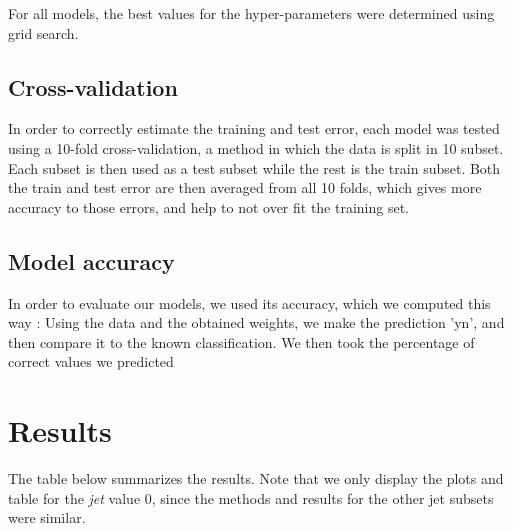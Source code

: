 \documentclass[a4paper]{article}
\begin{document}
\begin{multicols*}{2}
For all models, the best values for the hyper-parameters were determined using grid search.

\subsection{Cross-validation}
In order to correctly estimate the training and test error, each model was tested using a 10-fold cross-validation, a method in which the data is split in 10 subset. Each subset is then used as a test subset while the rest is the train subset. Both the train and test error are then averaged from all 10 folds, which gives more accuracy to those errors, and help to not over fit the training set.

\subsection{Model accuracy}
In order to evaluate our models, we used its accuracy, which we computed this way : Using the data and the obtained weights, we make the prediction 'yn', and then compare it to the known classification. We then took the percentage of correct values we predicted

\end{multicols*}
\newpage

\section{Results}
The table below summarizes the results. Note that we only display the plots and table for the \textit{jet} value 0, since the methods and results for the other jet subsets were similar.
\end{document}
